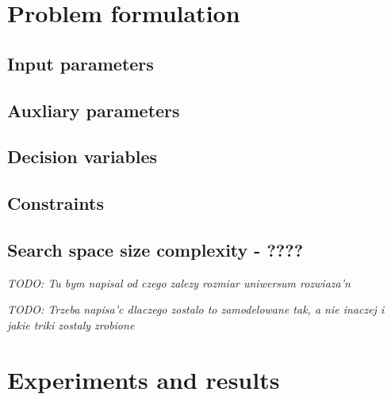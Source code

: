 {\section{Problem formulation}

\subsection{Input parameters}

\subsection{Auxliary parameters}

\subsection{Decision variables}

\subsection{Constraints}

\subsection{Search space size complexity - ????}

\emph{TODO: Tu bym napisal od czego zalezy rozmiar uniwersum rozwiaza'n}

\emph{TODO: Trzeba napisa'c dlaczego zostalo to zamodelowane tak, a nie inaczej i jakie triki zostaly zrobione}


\section{Experiments and results}

} %